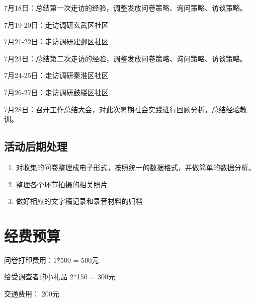 \documentclass[12pt]{ctexart}
\begin{document}
  7月18日：总结第一次走访的经验，调整发放问卷策略、询问策略、访谈策略。
  
  7月19-20日：走访调研玄武区社区
  
  7月21-22日：走访调研建邺区社区
  
  7月23日：总结第二次走访的经验，调整发放问卷策略、询问策略、访谈策略。
  
  7月24-25日：走访调研秦淮区社区
  
  7月26-27日：走访调研鼓楼区社区
  
  7月28日：召开工作总结大会，对此次暑期社会实践进行回顾分析，总结经验教训。
   
  \subsection{活动后期处理}
  \begin{enumerate}
      \item 对收集的问卷整理成电子形式，按照统一的数据格式，并做简单的数据分析。
      \item 整理各个环节拍摄的相关照片
      \item 做好相应的文字稿记录和录音材料的归档
  \end{enumerate}
  
\section{经费预算}

问卷打印费用：1*500 = 500元

给受调查者的小礼品 2*150 = 300元

交通费用： 200元
\end{document}
